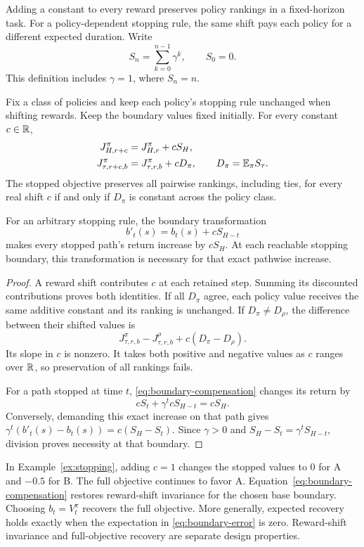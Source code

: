 Adding a constant to every reward preserves policy rankings in a fixed-horizon task. For a policy-dependent stopping rule, the same shift pays each policy for a different expected duration. Write
\[
S_n=\sum_{k=0}^{n-1}\gamma^k,\qquad S_0=0.
\]
This definition includes $\gamma=1$, where $S_n=n$.

\begin{theorem}
\label{thm:reward-shift}
Fix a class of policies and keep each policy's stopping rule unchanged when shifting rewards. Keep the boundary values fixed initially. For every constant $c\in\mathbb{R}$,
\begin{align}
J_{H,r+c}^\pi&=J_{H,r}^\pi+cS_H,\\
J_{\tau,r+c,b}^\pi&=J_{\tau,r,b}^\pi+cD_\pi,
\qquad D_\pi=\mathbb{E}_\pi S_\tau.
\label{eq:shift-stopped}
\end{align}
The stopped objective preserves all pairwise rankings, including ties, for every real shift $c$ if and only if $D_\pi$ is constant across the policy class.

For an arbitrary stopping rule, the boundary transformation
\begin{equation}
b'_t(s)=b_t(s)+cS_{H-t}
\label{eq:boundary-compensation}
\end{equation}
makes every stopped path's return increase by $cS_H$. At each reachable stopping boundary, this transformation is necessary for that exact pathwise increase.
\end{theorem}

\begin{proof}
A reward shift contributes $c$ at each retained step. Summing its discounted contributions proves both identities. If all $D_\pi$ agree, each policy value receives the same additive constant and its ranking is unchanged. If $D_\pi\ne D_\rho$, the difference between their shifted values is
\[
J_{\tau,r,b}^\pi-J_{\tau,r,b}^\rho+c(D_\pi-D_\rho).
\]
Its slope in $c$ is nonzero. It takes both positive and negative values as $c$ ranges over $\mathbb{R}$, so preservation of all rankings fails.

For a path stopped at time $t$, \eqref{eq:boundary-compensation} changes its return by
\[
cS_t+\gamma^t cS_{H-t}=cS_H.
\]
Conversely, demanding this exact increase on that path gives $\gamma^t(b'_t(s)-b_t(s))=c(S_H-S_t)$. Since $\gamma>0$ and $S_H-S_t=\gamma^tS_{H-t}$, division proves necessity at that boundary.
\end{proof}

In Example~\ref{ex:stopping}, adding $c=1$ changes the stopped values to $0$ for A and $-0.5$ for B. The full objective continues to favor A. Equation~\eqref{eq:boundary-compensation} restores reward-shift invariance for the chosen base boundary. Choosing $b_t=V_t^\pi$ recovers the full objective. More generally, expected recovery holds exactly when the expectation in \eqref{eq:boundary-error} is zero. Reward-shift invariance and full-objective recovery are separate design properties.


